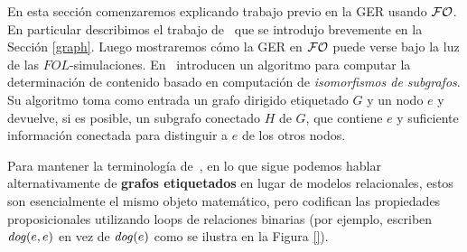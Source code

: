 En esta secci\'on comenzaremos explicando trabajo previo en la GER usando $\mathcal{FO}$. En particular describimos el trabajo de~\cite{Krahmer2003} que se introdujo brevemente en la Secci\'on \ref{graph}. Luego mostraremos c\'omo la GER en $\mathcal{FO}$ puede verse bajo la luz de las $FOL$-simulaciones.
En~\cite{Krahmer2003} introducen un algoritmo para computar la determinaci\'on de
contenido basado en computaci\'on de \emph{isomorfismos de subgrafos}. Su algoritmo toma como entrada
un grafo dirigido etiquetado $G$ y un nodo $e$ y devuelve, si es posible,
un subgrafo conectado $H$  de $G$, que contiene $e$ y suficiente informaci\'on conectada para
distinguir a $e$ de los otros nodos.

Para mantener la terminolog\'ia de~\cite{Krahmer2003}, en lo que sigue
podemos hablar alternativamente de \textbf{grafos etiquetados} en lugar de modelos relacionales, estos son esencialmente el mismo objeto matem\'atico, pero codifican las propiedades proposicionales utilizando
loops de relaciones binarias (por ejemplo, escriben $\mathit{dog}(e,e)$ en vez de $\mathit{dog}(e)$ como se ilustra en la Figura \ref{}).

